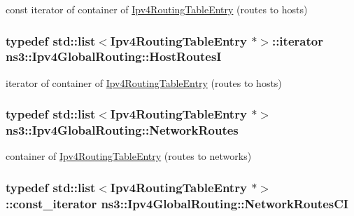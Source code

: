 const iterator of container of \hyperlink{classns3_1_1Ipv4RoutingTableEntry}{Ipv4\+Routing\+Table\+Entry} (routes to hosts) 

\subsubsection[{\texorpdfstring{Host\+RoutesI}{HostRoutesI}}]{\setlength{\rightskip}{0pt plus 5cm}typedef {\bf std\+::list}$<${\bf Ipv4\+Routing\+Table\+Entry} $\ast$$>$\+::iterator {\bf ns3\+::\+Ipv4\+Global\+Routing\+::\+Host\+RoutesI}\hspace{0.3cm}{\ttfamily [private]}}\hypertarget{classns3_1_1Ipv4GlobalRouting_a4a3de9839580400d39d5bac0b0d33308}{}\label{classns3_1_1Ipv4GlobalRouting_a4a3de9839580400d39d5bac0b0d33308}


iterator of container of \hyperlink{classns3_1_1Ipv4RoutingTableEntry}{Ipv4\+Routing\+Table\+Entry} (routes to hosts) 

\subsubsection[{\texorpdfstring{Network\+Routes}{NetworkRoutes}}]{\setlength{\rightskip}{0pt plus 5cm}typedef {\bf std\+::list}$<${\bf Ipv4\+Routing\+Table\+Entry} $\ast$$>$ {\bf ns3\+::\+Ipv4\+Global\+Routing\+::\+Network\+Routes}\hspace{0.3cm}{\ttfamily [private]}}\hypertarget{classns3_1_1Ipv4GlobalRouting_ab63c3f6778a619bb464078d9ee0112e9}{}\label{classns3_1_1Ipv4GlobalRouting_ab63c3f6778a619bb464078d9ee0112e9}


container of \hyperlink{classns3_1_1Ipv4RoutingTableEntry}{Ipv4\+Routing\+Table\+Entry} (routes to networks) 

\subsubsection[{\texorpdfstring{Network\+Routes\+CI}{NetworkRoutesCI}}]{\setlength{\rightskip}{0pt plus 5cm}typedef {\bf std\+::list}$<${\bf Ipv4\+Routing\+Table\+Entry} $\ast$$>$\+::const\+\_\+iterator {\bf ns3\+::\+Ipv4\+Global\+Routing\+::\+Network\+Routes\+CI}\hspace{0.3cm}{\ttfamily [private]}}\hypertarget{classns3_1_1Ipv4GlobalRouting_a951edfd8275e2329a7fd4c5f00ac420e}{}\label{classns3_1_1Ipv4GlobalRouting_a951edfd8275e2329a7fd4c5f00ac420e}


